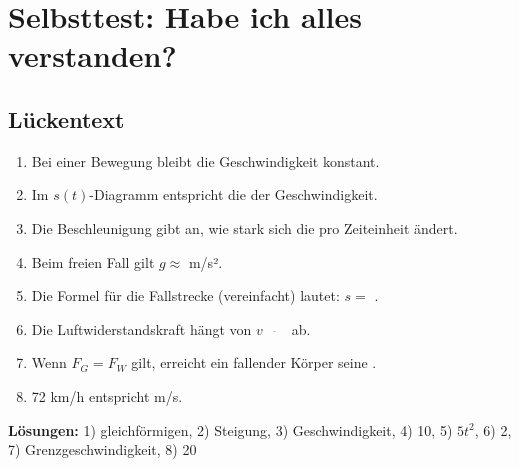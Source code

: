 \documentclass[11pt,a4paper]{article}
\begin{document}
\newpage
\section{Selbsttest: Habe ich alles verstanden?}

\subsection{Lückentext}

\begin{tcolorbox}[colback=lightgray, colframe=gray, boxrule=0.5pt]
\begin{enumerate}[itemsep=8pt]
\item Bei einer \underline{\hspace{3cm}} Bewegung bleibt die Geschwindigkeit konstant.

\item Im $s(t)$-Diagramm entspricht die \underline{\hspace{3cm}} der Geschwindigkeit.

\item Die Beschleunigung gibt an, wie stark sich die \underline{\hspace{3cm}} pro Zeiteinheit ändert.

\item Beim freien Fall gilt $g \approx$ \underline{\hspace{2cm}} m/s².

\item Die Formel für die Fallstrecke (vereinfacht) lautet: $s = $ \underline{\hspace{2cm}}.

\item Die Luftwiderstandskraft hängt von $v^{\underline{\hspace{1cm}}}$ ab.

\item Wenn $F_G = F_W$ gilt, erreicht ein fallender Körper seine \underline{\hspace{3cm}}.

\item 72 km/h entspricht \underline{\hspace{2cm}} m/s.
\end{enumerate}
\end{tcolorbox}

\textbf{Lösungen:} 1) gleichförmigen, 2) Steigung, 3) Geschwindigkeit, 4) 10, 5) $5t^2$, 6) 2, 7) Grenzgeschwindigkeit, 8) 20
\end{document}
